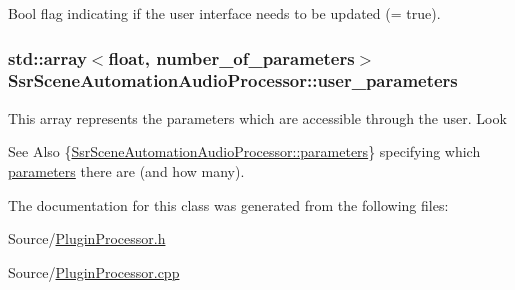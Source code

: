 Bool flag indicating if the user interface needs to be updated (= true). \hypertarget{classSsrSceneAutomationAudioProcessor_a65db1e242ec5ba4a421619efa63cd9ee}{
\subsubsection[{user\-\_\-parameters}]{\setlength{\rightskip}{0pt plus 5cm}std\-::array$<$float, {\bf number\-\_\-of\-\_\-parameters}$>$ Ssr\-Scene\-Automation\-Audio\-Processor\-::user\-\_\-parameters\hspace{0.3cm}{\ttfamily [private]}}}\label{classSsrSceneAutomationAudioProcessor_a65db1e242ec5ba4a421619efa63cd9ee}
This array represents the parameters which are accessible through the user. Look \begin{DoxySeeAlso}{See Also}
\{\hyperlink{classSsrSceneAutomationAudioProcessor_ae03aeb4847a435789be1b6112a7d92dd}{Ssr\-Scene\-Automation\-Audio\-Processor\-::parameters}\} specifying which \hyperlink{classSsrSceneAutomationAudioProcessor_ae03aeb4847a435789be1b6112a7d92dd}{parameters} there are (and how many). 
\end{DoxySeeAlso}


The documentation for this class was generated from the following files\-:\begin{DoxyCompactItemize}
\item 
Source/\hyperlink{PluginProcessor_8h}{Plugin\-Processor.\-h}\item 
Source/\hyperlink{PluginProcessor_8cpp}{Plugin\-Processor.\-cpp}\end{DoxyCompactItemize}
